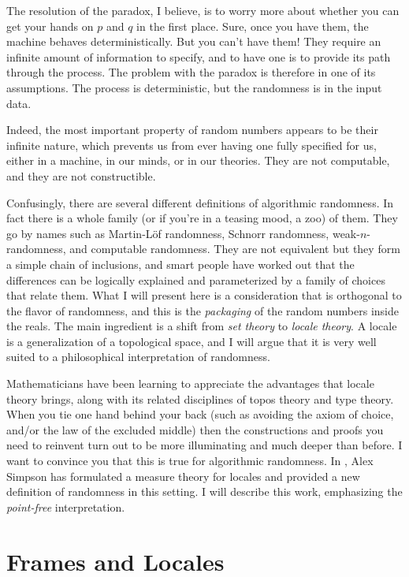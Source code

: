 \documentclass[12pt]{extarticle}
\begin{document}
The resolution of the paradox, I believe, is to worry more about whether you can get your hands on $p$ and $q$ in the first place. Sure, once you have them, the machine behaves deterministically. But you can't have them! They require an infinite amount of information to specify, and to have one is to provide its path through the process. The problem with the paradox is therefore in one of its assumptions. The process is deterministic, but the randomness is in the input data.

Indeed, the most important property of random numbers appears to be their infinite nature, which prevents us from ever having one fully specified for us, either in a machine, in our minds, or in our theories. They are not computable, and they are not constructible.

Confusingly, there are several different definitions of algorithmic randomness. In fact there is a whole family (or if you're in a teasing mood, a zoo) of them. They go by names such as Martin-Löf randomness, Schnorr randomness, weak-$n$-randomness, and computable randomness. They are not equivalent but they form a simple chain of inclusions, and smart people have worked out that the differences can be logically explained and parameterized by a family of choices that relate them. What I will present here is a consideration that is orthogonal to the flavor of randomness, and this is the \emph{packaging} of the random numbers inside the reals. The main ingredient is a shift from \emph{set theory} to \emph{locale theory}. A locale is a generalization of a topological space, and I will argue that it is very well suited to a philosophical interpretation of randomness.

Mathematicians have been learning to appreciate the advantages that locale theory brings, along with its related disciplines of topos theory and type theory. When you tie one hand behind your back (such as avoiding the axiom of choice, and/or the law of the excluded middle) then the constructions and proofs you need to reinvent turn out to be more illuminating and much deeper than before. I want to convince you that this is true for algorithmic randomness. In \cite{simpson}, Alex Simpson has formulated a measure theory for locales and provided a new definition of randomness in this setting. I will describe this work, emphasizing the \emph{point-free} interpretation.

\section{Frames and Locales}
\end{document}
